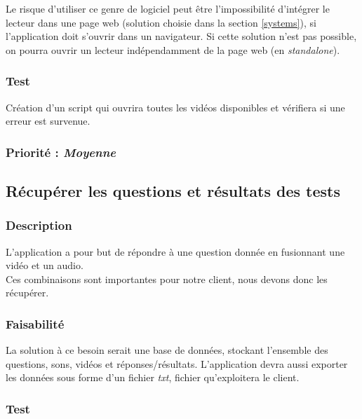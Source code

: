 \documentclass[a4paper,twoside,10pt]{report}
\begin{document}
Le risque d’utiliser ce genre de logiciel peut être l'impossibilité d'intégrer le lecteur dans une page web (solution choisie dans la section \ref{systems}), si l’application doit s’ouvrir dans un navigateur. Si cette solution n’est pas possible, on pourra ouvrir un lecteur indépendamment de la page web (en \textit{standalone}).

\subsubsection{Test}

Création d’un script qui ouvrira toutes les vidéos disponibles et vérifiera si une erreur est survenue.

\subsubsection{Priorité : \textit{Moyenne}}



\subsection{Récupérer les questions et résultats des tests}

  \subsubsection{Description}

    L’application a pour but de répondre à une question donnée en fusionnant une vidéo et un audio.\\
    Ces combinaisons sont importantes pour notre client, nous devons donc les récupérer.

  \subsubsection{Faisabilité}

    La solution à ce besoin serait une base de données, stockant l’ensemble des questions, sons, vidéos et réponses/résultats.
    L’application devra aussi exporter les données sous forme d’un fichier \textit{txt}, fichier qu’exploitera le client.    

  \subsubsection{Test}
\end{document}
